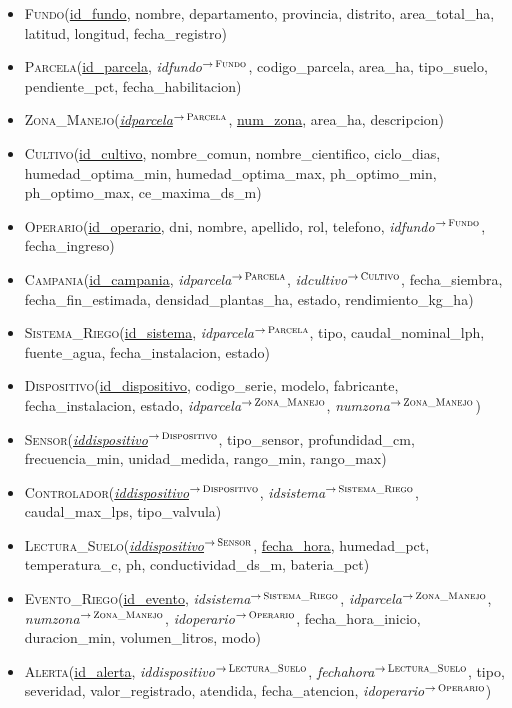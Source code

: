 \documentclass[11pt,letterpaper]{article}
\newcommand{\tbus}{\textunderscore\allowbreak}
\newcommand{\pk}[1]{\underline{#1}}
\newcommand{\fk}[2]{{\itshape\let\_\tbus #1}$^{\to\,\textsc{\let\_\tbus #2}}$}
\begin{document}
\begin{itemize}[leftmargin=1.2em,itemsep=0.3em]
\item \textsc{Fundo}(\pk{id\_fundo}, nombre, departamento, provincia, distrito, area\_total\_ha, latitud, longitud, fecha\_registro)
\item \textsc{Parcela}(\pk{id\_parcela}, \fk{id\_fundo}{Fundo}, codigo\_parcela, area\_ha, tipo\_suelo, pendiente\_pct, fecha\_habilitacion)
\item \textsc{Zona\_Manejo}(\pk{\fk{id\_parcela}{Parcela}}, \pk{num\_zona}, area\_ha, descripcion)
\item \textsc{Cultivo}(\pk{id\_cultivo}, nombre\_comun, nombre\_cientifico, ciclo\_dias, humedad\_optima\_min, humedad\_optima\_max, ph\_optimo\_min, ph\_optimo\_max, ce\_maxima\_ds\_m)
\item \textsc{Operario}(\pk{id\_operario}, dni, nombre, apellido, rol, telefono, \fk{id\_fundo}{Fundo}, fecha\_ingreso)
\item \textsc{Campania}(\pk{id\_campania}, \fk{id\_parcela}{Parcela}, \fk{id\_cultivo}{Cultivo}, fecha\_siembra, fecha\_fin\_estimada, densidad\_plantas\_ha, estado, rendimiento\_kg\_ha)
\item \textsc{Sistema\_Riego}(\pk{id\_sistema}, \fk{id\_parcela}{Parcela}, tipo, caudal\_nominal\_lph, fuente\_agua, fecha\_instalacion, estado)
\item \textsc{Dispositivo}(\pk{id\_dispositivo}, codigo\_serie, modelo, fabricante, fecha\_instalacion, estado, \fk{id\_parcela}{Zona\_Manejo}, \fk{num\_zona}{Zona\_Manejo})
\item \textsc{Sensor}(\pk{\fk{id\_dispositivo}{Dispositivo}}, tipo\_sensor, profundidad\_cm, frecuencia\_min, unidad\_medida, rango\_min, rango\_max)
\item \textsc{Controlador}(\pk{\fk{id\_dispositivo}{Dispositivo}}, \fk{id\_sistema}{Sistema\_Riego}, caudal\_max\_lps, tipo\_valvula)
\item \textsc{Lectura\_Suelo}(\pk{\fk{id\_dispositivo}{Sensor}}, \pk{fecha\_hora}, humedad\_pct, temperatura\_c, ph, conductividad\_ds\_m, bateria\_pct)
\item \textsc{Evento\_Riego}(\pk{id\_evento}, \fk{id\_sistema}{Sistema\_Riego}, \fk{id\_parcela}{Zona\_Manejo}, \fk{num\_zona}{Zona\_Manejo}, \fk{id\_operario}{Operario}, fecha\_hora\_inicio, duracion\_min, volumen\_litros, modo)
\item \textsc{Alerta}(\pk{id\_alerta}, \fk{id\_dispositivo}{Lectura\_Suelo}, \fk{fecha\_hora}{Lectura\_Suelo}, tipo, severidad, valor\_registrado, atendida, fecha\_atencion, \fk{id\_operario}{Operario})

\end{itemize}
\end{document}
